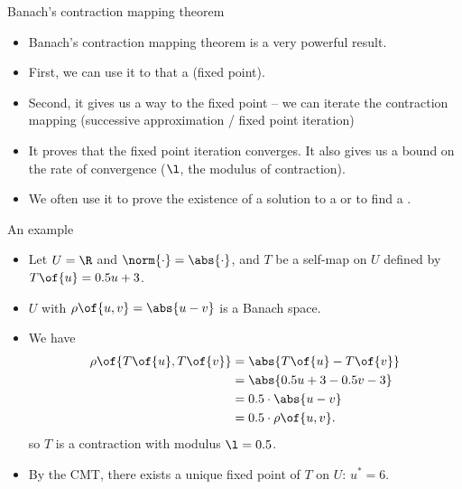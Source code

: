 \documentclass[11pt,xcolor={dvipsnames},aspectratio=159,hyperref={pdftex,pdfpagemode=UseNone,hidelinks,pdfdisplaydoctitle=true},usepdftitle=false]{beamer}
\begin{document}
\begin{frame}{Banach's contraction mapping theorem}
    \begin{itemize}
        \item Banach's contraction mapping theorem is a very powerful result.
        \item First, we can use it to  that a  (fixed point).
        \item Second, it gives us a way to  the fixed point -- we can iterate the contraction mapping (successive approximation / fixed point iteration)
        \item It proves that the fixed point iteration converges. It also gives us a bound on the rate of convergence ($\l$, the modulus of contraction).
        \item We often use it to prove the existence of a solution to a  or to find a .
    \end{itemize}
    \end{frame}



    \begin{frame}{An example}
        \begin{itemize}
            \item Let $U = \R$ and $\norm{\cdot} = \abs{\cdot}$, and $T$ be a self-map on $U$ defined by $T\of{u} = 0.5u + 3$.
            \item $U$ with $\rho\of{u,v}=\abs{u-v}$ is a Banach space. 
            \item We have \begin{align*} 
                \rho\of{T\of{u},T\of{v}} &=  \abs{T\of{u}-T\of{v}} \\ &= \abs{0.5u + 3 - 0.5v - 3} \\ &= 0.5 \cdot \abs{u-v} \\ & = 0.5 \cdot \rho\of{u,v}.
            \end{align*} so $T$ is a contraction with modulus $\l=0.5$.
            \item By the CMT, there exists a unique fixed point of $T$ on $U$: $u^* = 6$.
        \end{itemize}
        \end{frame}
\end{document}
